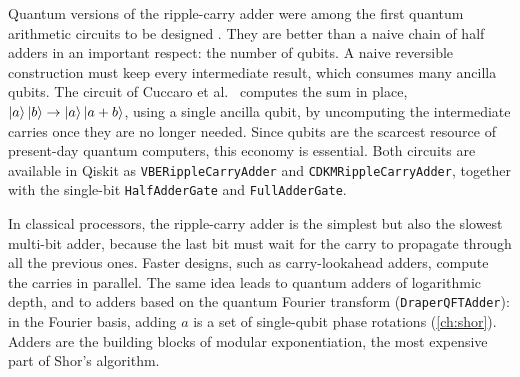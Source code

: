 Quantum versions of the ripple-carry adder were among the first quantum arithmetic circuits to be designed \cite{VBE1996}. They are better than a naive chain of half adders in an important respect:
the number of qubits. A naive reversible construction must keep every intermediate result, which consumes many ancilla qubits. The circuit of Cuccaro et al.\ \cite{Cuccaro2004} computes the sum in
place, $\left|a\right\rangle\left|b\right\rangle\to\left|a\right\rangle\left|a+b\right\rangle$, using a single ancilla qubit, by uncomputing the intermediate carries once they are no longer needed. Since qubits are the scarcest resource of present-day
quantum computers, this economy is essential. Both circuits are available in Qiskit as \texttt{VBERippleCarryAdder} and \texttt{CDKMRippleCarryAdder}, together with the single-bit
\texttt{HalfAdderGate} and \texttt{FullAdderGate}.

In classical processors, the ripple-carry adder is the simplest but also the slowest multi-bit adder, because the last bit must wait for the carry to propagate through all the previous ones. Faster
designs, such as carry-lookahead adders, compute the carries in parallel. The same idea leads to quantum adders of logarithmic depth, and to adders based on the quantum Fourier transform
(\texttt{DraperQFTAdder}): in the Fourier basis, adding $a$ is a set of single-qubit phase rotations (\cref{ch:shor}). Adders are the building blocks of modular exponentiation, the most expensive part
of Shor's algorithm.
